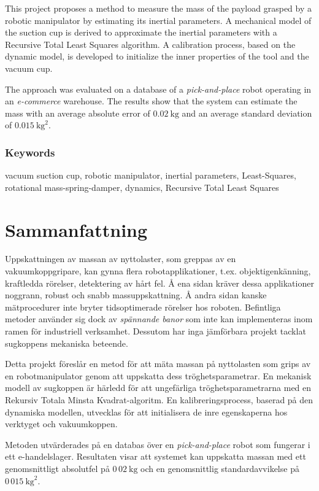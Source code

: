 \documentclass[/home/francois/latex/report/main.tex]{subfiles}
\begin{document}
This project proposes a method to measure the mass of the payload grasped by a robotic manipulator by estimating its inertial parameters. A mechanical model of the suction cup is derived to approximate the inertial parameters with a Recursive Total Least Squares algorithm. A calibration process, based on the dynamic model, is developed to initialize the inner properties of the tool and the vacuum cup.

The approach was evaluated on a database of a \textit{pick-and-place} robot operating in an \textit{e-commerce} warehouse. The results show that the system can estimate the mass with an average absolute error of $0.02 \ \si{\kilogram}$ and an average standard deviation of $0.015 \ \si{\kilogram\squared}$.

\subsection*{Keywords}

vacuum suction cup, robotic manipulator, inertial parameters, Least-Squares, rotational mass-spring-damper, dynamics, Recursive Total Least Squares

\newpage
\thispagestyle{plain}

\chapter*{Sammanfattning}

Uppskattningen av massan av nyttolaster, som greppas av en vakuumkoppgripare, kan gynna flera robotapplikationer, t.ex. objektigenkänning, kraftledda rörelser, detektering av hårt fel. Å ena sidan kräver dessa applikationer noggrann, robust och snabb massuppskattning. Å andra sidan kanske mätprocedurer inte bryter tidsoptimerade rörelser hos roboten. Befintliga metoder använder sig dock av \textit{spännande banor} som inte kan implementeras inom ramen för industriell verksamhet. Dessutom har inga jämförbara projekt tacklat sugkoppens mekaniska beteende.

Detta projekt föreslår en metod för att mäta massan på nyttolasten som grips av en robotmanipulator genom att uppskatta dess tröghetsparametrar. En mekanisk modell av sugkoppen är härledd för att ungefärliga tröghetsparametrarna med en Rekursiv Totala Minsta Kvadrat-algoritm. En kalibreringsprocess, baserad på den dynamiska modellen, utvecklas för att initialisera de inre egenskaperna hos verktyget och vakuumkoppen.

Metoden utvärderades på en databas över en \textit{pick-and-place} robot som fungerar i ett e-handelslager. Resultaten visar att systemet kan uppskatta massan med ett genomsnittligt absolutfel på $0\,02 \ \si{\kilogram}$ och en genomsnittlig standardavvikelse på $0\,015 \ \si{\kilogram\squared}$.
\end{document}
